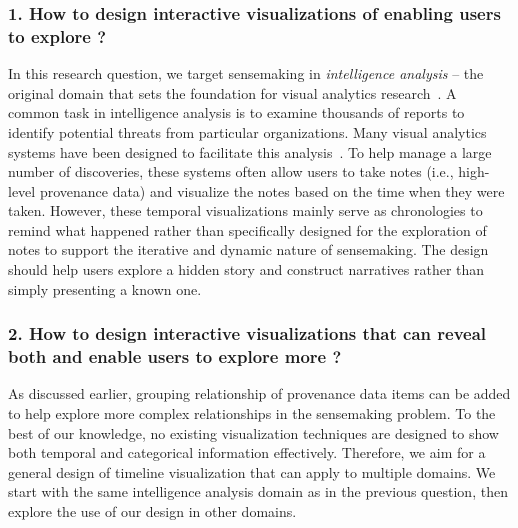 \subsubsection*{1. How to design interactive visualizations of  enabling users to explore ?}
In this research question, we target sensemaking in \emph{intelligence analysis} -- the original domain that sets the foundation for visual analytics research~\cite{Thomas2005}. A common task in intelligence analysis is to examine thousands of reports to identify potential threats from particular organizations. Many visual analytics systems have been designed to facilitate this analysis~\cite{Wright2006,Stasko2007}. To help manage a large number of discoveries, these systems often allow users to take notes (i.e., high-level provenance data) and visualize the notes based on the time when they were taken. However, these temporal visualizations mainly serve as chronologies to remind what happened rather than specifically designed for the exploration of notes to support the iterative and dynamic nature of sensemaking. The design should help users explore a hidden story and construct narratives rather than simply presenting a known one.

\subsubsection*{2. How to design interactive visualizations that can reveal both  and enable users to explore more ?}
As discussed earlier, grouping relationship of provenance data items can be added  to help explore more complex relationships in the sensemaking problem. To the best of our knowledge, no existing visualization techniques are designed to show both temporal and categorical information effectively. Therefore, we aim for a general design of timeline visualization that can apply to multiple domains. We start with the same intelligence analysis domain as in the previous question, then explore the use of our design in other domains.

